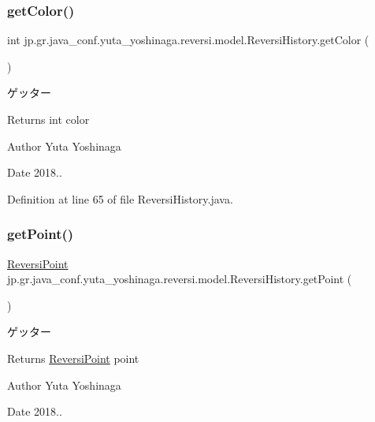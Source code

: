 \subsubsection{\texorpdfstring{get\+Color()}{getColor()}}
{\footnotesize\ttfamily int jp.\+gr.\+java\+\_\+conf.\+yuta\+\_\+yoshinaga.\+reversi.\+model.\+Reversi\+History.\+get\+Color (\begin{DoxyParamCaption}{ }\end{DoxyParamCaption})}



ゲッター 

\begin{DoxyReturn}{Returns}
int color 
\end{DoxyReturn}
\begin{DoxyAuthor}{Author}
Yuta Yoshinaga 
\end{DoxyAuthor}
\begin{DoxyDate}{Date}
2018.. 
\end{DoxyDate}


Definition at line 65 of file Reversi\+History.\+java.

\mbox{\label{classjp_1_1gr_1_1java__conf_1_1yuta__yoshinaga_1_1reversi_1_1model_1_1_reversi_history_a108f7d23cbfcd1466c954123a3d8109c}} 
\subsubsection{\texorpdfstring{get\+Point()}{getPoint()}}
{\footnotesize\ttfamily \hyperlink{classjp_1_1gr_1_1java__conf_1_1yuta__yoshinaga_1_1reversi_1_1model_1_1_reversi_point}{Reversi\+Point} jp.\+gr.\+java\+\_\+conf.\+yuta\+\_\+yoshinaga.\+reversi.\+model.\+Reversi\+History.\+get\+Point (\begin{DoxyParamCaption}{ }\end{DoxyParamCaption})}



ゲッター 

\begin{DoxyReturn}{Returns}
\hyperlink{classjp_1_1gr_1_1java__conf_1_1yuta__yoshinaga_1_1reversi_1_1model_1_1_reversi_point}{Reversi\+Point} point 
\end{DoxyReturn}
\begin{DoxyAuthor}{Author}
Yuta Yoshinaga 
\end{DoxyAuthor}
\begin{DoxyDate}{Date}
2018.. 
\end{DoxyDate}


